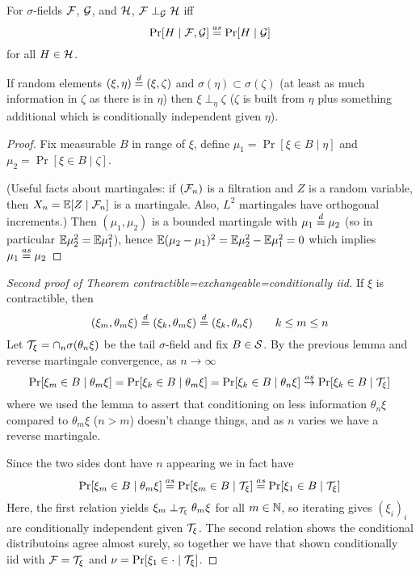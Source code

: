 \begin{proposition}
  \label{prop:cond-indep-doob}
  For $\sigma$-fields $\mathcal{F}$, $\mathcal{G}$, and $\mathcal{H}$, $\mathcal{F} \perp_{\mathcal{G}} \mathcal{H}$ iff
  \[
    \Pr[H \mid \mathcal{F}, \mathcal{G}] \overset{as}{=} \Pr[H \mid \mathcal{G}]
  \]
  for all $H \in \mathcal{H}$.
\end{proposition}

\begin{lemma}
  If random elements $(\xi, \eta) \overset{d}{=} (\xi, \zeta)$
  and $\sigma(\eta) \subset \sigma(\zeta)$ (at least as much information
  in $\zeta$ as there is in $\eta$) then
  $\xi \perp_\eta \zeta$ ($\zeta$ is built from $\eta$ plus
  something additional which is conditionally independent given $\eta$).
\end{lemma}

\begin{proof}
  Fix measurable $B$ in range of $\xi$, define
  $\mu_1 = \Pr[\xi \in B \mid \eta]$
  and $\mu_2 = \Pr[\xi \in B \mid \zeta]$.

  (Useful facts about martingales: if $(\mathcal{F}_n)$ is a filtration and $Z$ is a
  random variable, then $X_n = \mathbb{E}[Z \mid \mathcal{F}_n]$ is a martingale. Also,
  $L^2$ martingales have orthogonal increments.)
  Then $(\mu_1, \mu_2)$ is a bounded martingale with $\mu_1 \overset{d}{=} \mu_2$
  (so in particular $\mathbb{E} \mu_2^2 = \mathbb{E} \mu_1^2$),
  hence $\mathbb{E}(\mu_2 - \mu_1)^2 = \mathbb{E} \mu_2^2 - \mathbb{E} \mu_1^2 = 0$ which implies
  $\mu_1 \overset{as}{=} \mu_2$
\end{proof}

\begin{proof}[Second proof of Theorem contractible=exchangeable=conditionally iid]
  If $\xi$ is contractible, then
  \[
    (\xi_m, \theta_m \xi) \overset{d}{=} (\xi_k, \theta_m \xi) \overset{d}{=} (\xi_k, \theta_n \xi)
    \qquad k \leq m \leq n
  \]
  Let $\mathcal{T}_\xi = \cap_n \sigma(\theta_n \xi)$ be the tail $\sigma$-field and
  fix $B \in \mathcal{S}$. By the previous lemma and reverse martingale convergence,
  as $n \to \infty$
  \[
    \Pr[\xi_m \in B \mid \theta_m \xi]
    = \Pr[\xi_k \in B \mid \theta_m \xi]
    = \Pr[\xi_k \in B \mid \theta_n \xi]
    \overset{as}{\to} \Pr[\xi_k \in B \mid \mathcal{T}_\xi]
  \]
  where we used the lemma to assert that conditioning on less
  information $\theta_n \xi$ compared to $\theta_m \xi$ ($n > m$)
  doesn't change things, and as $n$ varies we have a reverse martingale.

  Since the two sides dont have $n$ appearing we in fact have
  \[
    \Pr[\xi_m \in B \mid \theta_m \xi]
    \overset{as}{=} \Pr[\xi_m \in B \mid \mathcal{T}_\xi]
    \overset{as}{=} \Pr[\xi_1 \in B \mid \mathcal{T}_\xi]
  \]
  Here, the first relation yields $\xi_m \perp_{\mathcal{T}_\xi} \theta_m \xi$ for all
  $m \in \mathbb{N}$, so iterating gives $(\xi_i)_i$ are conditionally independent
  given $\mathcal{T}_\xi$.  The second relation shows the conditional distributoins
  agree almost surely, so together we have that shown conditionally iid with
  $\mathcal{F}= \mathcal{T}_\xi$ and $\nu=\Pr[\xi_1 \in \cdot \mid \mathcal{T}_\xi]$.
\end{proof}

